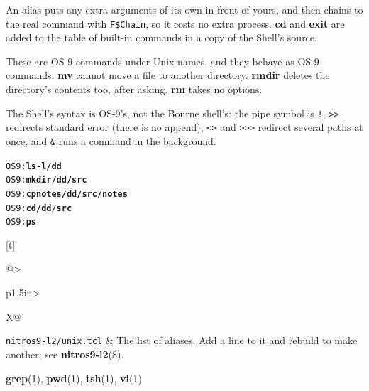 \documentclass[10pt,twoside,openany]{book}
\makeatletter
\newcommand{\cmd}[1]{\textbf{#1}}            %
\newcommand{\file}[1]{\texttt{#1}}           %
\newcommand{\rp}[2]{\textbf{#1}(#2)}         %
\newenvironment{ex}{\par\vspace{0.3ex}\small\begin{alltt}}{\end{alltt}\vspace{0.3ex}}
\newenvironment{refpage}{%
  \begin{list}{}{%
    \setlength{\leftmargin}{1.3in}\setlength{\labelwidth}{1.2in}%
    \setlength{\labelsep}{0.1in}\setlength{\itemsep}{1.6ex}%
    \setlength{\parsep}{0.7ex}\setlength{\topsep}{0pt}\setlength{\listparindent}{0pt}%
    \renewcommand{\makelabel}[1]{\sffamily\bfseries ##1\hfil}}}%
  {\end{list}}
\newcommand{\rh}[1]{\item[#1]}
\newenvironment{keys}[1][1.1in]{\par\tabularx{\linewidth}[t]{@{}>{\raggedright\arraybackslash}p{#1}>{\raggedright\arraybackslash}X@{}}}%
  {\endtabularx\par}
\makeatother
\begin{document}
\begin{refpage}
An alias puts any extra arguments of its own in front of yours, and then
chains to the real command with \texttt{F\$Chain}, so it costs no extra
process. \cmd{cd} and \cmd{exit} are added to the table of built-in
commands in a copy of the Shell's source.
\rh{Restrictions}
These are OS-9 commands under Unix names, and they behave as OS-9
commands. \cmd{mv} cannot move a file to another directory. \cmd{rmdir}
deletes the directory's contents too, after asking. \cmd{rm} takes no
options.

The Shell's syntax is OS-9's, not the Bourne shell's: the pipe symbol is
\texttt{!}, \texttt{>>} redirects standard error (there is no append),
\texttt{<>} and \texttt{>>>} redirect several paths at once, and
\texttt{\&} runs a command in the background.
\rh{Examples}
\begin{ex}
OS9:\textbf{ls -l /dd}
OS9:\textbf{mkdir /dd/src}
OS9:\textbf{cp notes /dd/src/notes}
OS9:\textbf{cd /dd/src}
OS9:\textbf{ps}
\end{ex}
\rh{Files}
\begin{keys}[1.5in]
\file{nitros9-l2/unix.tcl} & The list of aliases. Add a line to it and
rebuild to make another; see \rp{nitros9-l2}{8}.\\
\end{keys}
\rh{See Also} \rp{grep}{1}, \rp{pwd}{1}, \rp{tsh}{1}, \rp{vi}{1}
\end{refpage}
\end{document}
